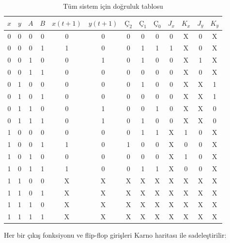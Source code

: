 \begin{table}[H]
\centering
\caption{Tüm sistem için doğruluk tablosu}
\label{tab:B.19}
\small
\begin{tabular}{cccc|cc|ccc|cccc}
\toprule
$x$ & $y$ & $A$ & $B$ & $x(t+1)$ & $y(t+1)$ & $\text{Ç}_2$ & $\text{Ç}_1$ & $\text{Ç}_0$ & $J_x$ & $K_x$ & $J_y$ & $K_y$ \\
\midrule
0 & 0 & 0 & 0 & 0 & 0 & 0 & 0 & 0 & 0 & X & 0 & X \\
0 & 0 & 0 & 1 & 1 & 0 & 0 & 1 & 1 & 1 & X & 0 & X \\
0 & 0 & 1 & 0 & 0 & 1 & 0 & 1 & 0 & 0 & X & 1 & X \\
0 & 0 & 1 & 1 & 0 & 0 & 0 & 0 & 0 & 0 & X & 0 & X \\
0 & 1 & 0 & 0 & 0 & 0 & 0 & 1 & 0 & 0 & X & X & 1 \\
0 & 1 & 0 & 1 & 0 & 0 & 0 & 0 & 0 & 0 & X & X & 1 \\
0 & 1 & 1 & 0 & 0 & 1 & 0 & 0 & 1 & 0 & X & X & 0 \\
0 & 1 & 1 & 1 & 0 & 1 & 0 & 1 & 0 & 0 & X & X & 0 \\
1 & 0 & 0 & 0 & 0 & 0 & 0 & 1 & 1 & X & 1 & 0 & X \\
1 & 0 & 0 & 1 & 1 & 0 & 1 & 0 & 0 & X & 0 & 0 & X \\
1 & 0 & 1 & 0 & 0 & 0 & 0 & 0 & 0 & X & 1 & 0 & X \\
1 & 0 & 1 & 1 & 1 & 0 & 0 & 1 & 1 & X & 0 & 0 & X \\
1 & 1 & 0 & 0 & X & X & X & X & X & X & X & X & X \\
1 & 1 & 0 & 1 & X & X & X & X & X & X & X & X & X \\
1 & 1 & 1 & 0 & X & X & X & X & X & X & X & X & X \\
1 & 1 & 1 & 1 & X & X & X & X & X & X & X & X & X \\
\bottomrule
\end{tabular}
\end{table}

Her bir çıkış fonksiyonu ve flip-flop girişleri Karno haritası ile sadeleştirilir:

